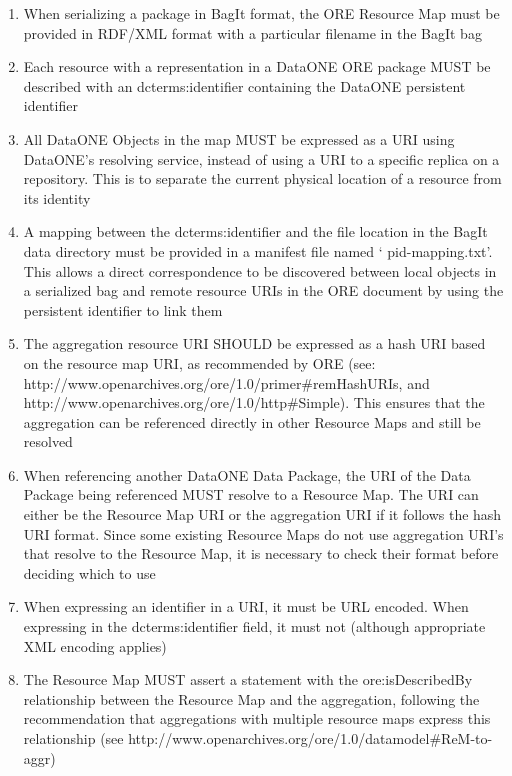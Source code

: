 \documentclass[conference]{IEEEtran}
\begin{document}
\begin{enumerate}
    \item{When serializing a package in BagIt format, the ORE Resource Map must be provided in RDF/XML format with a particular filename in the BagIt bag}
    \item{Each resource with a representation in a DataONE ORE package MUST be described with an ​dcterms:identifier​ containing the DataONE persistent identifier}
    \item{All DataONE Objects in the map MUST be expressed as a URI using DataONE’s resolving service, instead of using a URI to a specific replica on a repository. This is to separate the current physical location of a resource from its identity}
    \item{A mapping between the dcterms:identifier and the file location in the BagIt data directory must be provided in a manifest file named ‘ pid-mapping.txt’. This allows a direct correspondence to be discovered between local objects in a serialized bag and remote resource URIs in the ORE document by using the persistent identifier to link them}
    \item{The aggregation resource URI SHOULD be expressed as a hash URI based on the resource map URI, as recommended by ORE (see: http://www.openarchives.org/ore/1.0/primer\#remHashURIs, and http://www.openarchives.org/ore/1.0/http\#Simple). This ensures that the aggregation can be referenced directly in other Resource Maps and still be resolved}
    \item{When referencing another DataONE Data Package, the URI of the Data Package being referenced MUST resolve to a Resource Map. The URI can either be the Resource Map URI or the aggregation URI if it follows the hash URI format. Since some existing Resource Maps do not use aggregation URI’s that resolve to the Resource Map, it is necessary to check their format before deciding which to use}
    \item{When expressing an identifier in a URI, it must be URL encoded. When expressing in the dcterms:identifier field, it must not (although appropriate XML encoding applies)}
    \item{The Resource Map MUST assert a statement with the ore:isDescribedBy relationship between the Resource Map and the aggregation, following the recommendation that aggregations with multiple resource maps express this relationship (see http://www.openarchives.org/ore/1.0/datamodel\#ReM-to-aggr)}
\end{enumerate}
\end{document}
